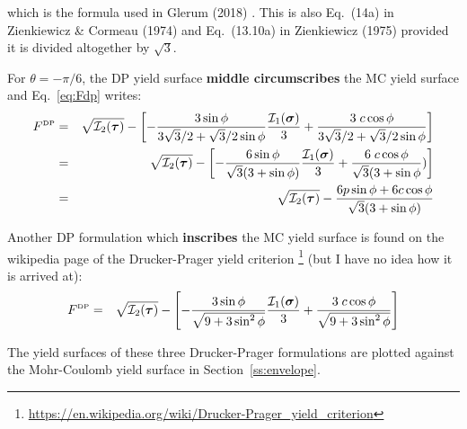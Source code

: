 which is the formula used in Glerum \etal (2018) \cite{gltf18}.
This is also Eq.~(14a) in Zienkiewicz \& Cormeau (1974) \cite{zico74}
and Eq.~(13.10a) in Zienkiewicz (1975) \cite{zien75} provided it is divided 
altogether by $\sqrt 3$. 


For $\theta=-\pi/6$, the DP yield surface {\bf middle circumscribes} the MC yield surface 
and Eq.~\eqref{eq:Fdp} writes:
\begin{eqnarray}
F^{\text{\tiny DP}}
&=& \sqrt{{\cal I}_2({\bm \tau})} 
- \left[ -\frac{3 \sin\phi}{ 3 \sqrt{3}/2 + \sqrt{3}/2 \sin\phi}  \frac{{\cal I}_1({\bm \sigma})}{3}
+ \frac{ 3\; c \cos \phi }{ 3 \sqrt{3}/2 + \sqrt{3}/2 \sin\phi} \right] \nonumber\\
&=& \sqrt{{\cal I}_2({\bm \tau})} 
- \left[ -\frac{6 \sin\phi}{\sqrt{3} (3 + \sin\phi) }  \frac{{\cal I}_1({\bm \sigma})}{3}
+ \frac{ 6\; c \cos \phi }{ \sqrt{3}(3 + \sin\phi}) \right] \nonumber\\
&=& \sqrt{{\cal I}_2({\bm \tau})} 
- \frac{6 p \sin\phi + 6 c \cos \phi}{\sqrt{3} (3 + \sin\phi) } 
\end{eqnarray}

Another DP formulation which {\bf inscribes} the MC yield surface is found on the 
wikipedia page of the Drucker-Prager yield criterion
\footnote{\url{https://en.wikipedia.org/wiki/Drucker-Prager_yield_criterion}}
(but I have no idea how it is arrived at):
\begin{eqnarray}
F^{\text{\tiny DP}}
&=& \sqrt{{\cal I}_2({\bm \tau})} 
- \left[ -\frac{3 \sin\phi}{\sqrt{9+3\sin^2\phi} }  \frac{{\cal I}_1({\bm \sigma})}{3}
+ \frac{ 3\; c \cos \phi }{ \sqrt{9+3\sin^2\phi} } \right] \label{eq:dp3}
\end{eqnarray}

The yield surfaces of these three Drucker-Prager formulations are plotted against the Mohr-Coulomb
yield surface in Section~\ref{ss:envelope}. 






